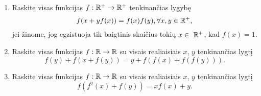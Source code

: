 \begin{enumerate}
   \item Raskite visas funkcijas $f:\mathbb R^+ \to \mathbb R^+$ tenkinančias lygybę
    $$f(x+yf(x))=f(x)f(y), \forall x,y \in \mathbb R^+,$$ jei žinome, jog
    egzistuoja tik baigtinis skaičius tokių $x \in \ \mathbb R^+$, kad $f(x)=1$.
  \item Raskite visas funkcijas $f: \mathbb R \to \mathbb R$ su visais realiaisiais $x$,
    $y$ tenkinančias lygtį $$f(y)+f(x+f(y))= y + f(f(x)+f(f(y))).$$
  \item Raskite visas funkcijas $f: \mathbb R \to \mathbb R$ su visais realiaisiais $x$,
    $y$ tenkinančias lygtį $$f(f^2(x)+f(y))=xf(x)+y.$$

\end{enumerate}
